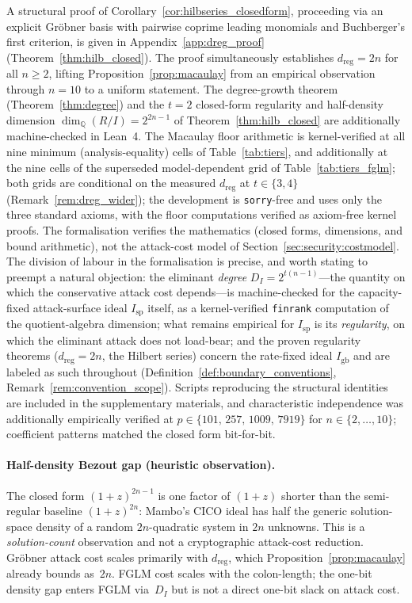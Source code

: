\documentclass[11pt,a4paper]{article}
\theoremstyle{definition}
\begin{document}
\noindent
A structural proof of Corollary~\ref{cor:hilbseries_closedform},
proceeding via an explicit Gr\"obner basis with pairwise coprime
leading monomials and Buchberger's first criterion, is given in
Appendix~\ref{app:dreg_proof} (Theorem~\ref{thm:hilb_closed}). The
proof simultaneously establishes $d_{\mathrm{reg}} = 2n$ for all
$n \ge 2$, lifting Proposition~\ref{prop:macaulay} from an empirical
observation through $n = 10$ to a uniform statement. The degree-growth
theorem (Theorem~\ref{thm:degree}) and the $t=2$ closed-form
regularity and half-density dimension
$\dim_{\mathbb{Q}}(R/I) = 2^{2n-1}$ of Theorem~\ref{thm:hilb_closed}
are additionally machine-checked in Lean~4. The Macaulay floor
arithmetic is kernel-verified at all nine minimum (analysis-equality)
cells of Table~\ref{tab:tiers}, and additionally at the nine cells
of the superseded model-dependent grid of
Table~\ref{tab:tiers_fglm}; both grids are
conditional on the measured $d_{\mathrm{reg}}$ at $t \in \{3, 4\}$
(Remark~\ref{rem:dreg_wider}); the development is \texttt{sorry}-free
and uses only the three standard axioms, with the floor computations
verified as axiom-free kernel proofs. The formalisation verifies the
mathematics (closed forms, dimensions, and bound arithmetic), not the
attack-cost model of Section~\ref{sec:security:costmodel}. The
division of labour in the formalisation is precise, and worth
stating to preempt a natural objection: the eliminant \emph{degree}
$D_I = 2^{t(n-1)}$---the quantity on which the conservative attack
cost depends---is machine-checked for the capacity-fixed
attack-surface ideal $I_{\mathrm{sp}}$ itself, as a kernel-verified
\texttt{finrank} computation of the quotient-algebra dimension; what
remains empirical for $I_{\mathrm{sp}}$ is its \emph{regularity}, on
which the eliminant attack does not load-bear; and the proven
regularity theorems ($d_{\mathrm{reg}} = 2n$, the Hilbert series)
concern the rate-fixed ideal $I_{\mathrm{gb}}$ and are labeled as
such throughout (Definition~\ref{def:boundary_conventions},
Remark~\ref{rem:convention_scope}). Scripts
reproducing the structural identities are included in the
supplementary materials, and characteristic independence was
additionally empirically verified at
$p \in \{101,\,257,\,1009,\,7919\}$ for $n \in \{2, \ldots, 10\}$;
coefficient patterns matched the closed form bit-for-bit.

\paragraph{Half-density Bezout gap (heuristic observation).}
The closed form $(1+z)^{2n-1}$ is one factor of $(1+z)$ shorter than
the semi-regular baseline $(1+z)^{2n}$: Mambo's CICO ideal has half
the generic solution-space density of a random $2n$-quadratic system
in $2n$ unknowns. This is a \emph{solution-count} observation and not
a cryptographic attack-cost reduction. Gr\"obner attack cost scales
primarily with $d_{\mathrm{reg}}$, which Proposition~\ref{prop:macaulay}
already bounds as~$2n$. FGLM cost scales with the colon-length; the
one-bit density gap enters FGLM via~$D_I$ but is not a direct one-bit
slack on attack cost.
\end{document}
